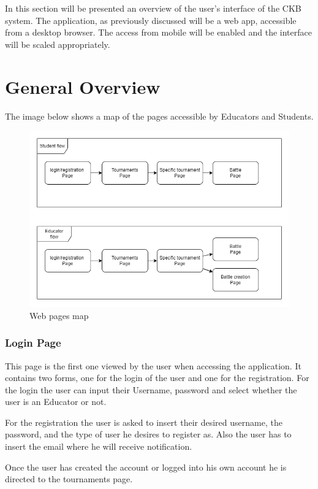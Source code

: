 In this section will be presented an overview of the user's interface of the \ac{CKB} system. The application, as previously discussed will be a web app, accessible from a desktop browser. The access from mobile will be enabled and the interface will be scaled appropriately.

\section{General Overview}

The image below shows a map of the pages accessible by Educators and Students.

\begin{figure}[H]
    \centering
    \includegraphics[width=0.95\linewidth]{misc//Images/flow.png}
    \caption{Web pages map}
    \label{fig:enter-label}
\end{figure}
\newpage
\subsubsection{Login Page}
This page is the first one viewed by the user when accessing the application. It contains two forms, one for the login of the user and one for the registration.
For the login the user can input their Username, password and select whether the user is an Educator or not.

For the registration the user is asked to insert their desired username, the password, and the type of user he desires to register as. Also the user has to insert the email where he will receive notification.

Once the user has created the account or logged into his own account he is directed to the tournaments page.

